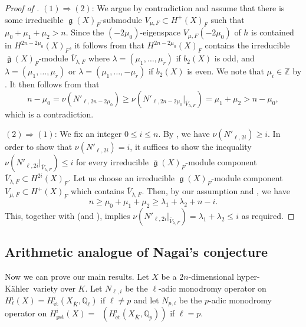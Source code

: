 \documentclass[12pt,reqno]{amsart}
\theoremstyle{definition}
\newcommand{\Q}{{\mathds Q}}
\newcommand{\Z}{{\mathds Z}}
\DeclareMathOperator{\Dpst}{\mathit{D}_{\mathrm{pst}}}
\renewcommand\ge{\mathop{\mathfrak{g}}\nolimits}
\newcommand{\et}{\mathrm{\acute{e}t}}
\newcommand{\hk}{hyper-Kähler~}
\DeclareMathOperator{\pst}{pst}
\numberwithin{equation}{section}
\begin{document}
\begin{proof}[Proof of ]


$(1) \Rightarrow (2)$: 
We argue by contradiction and assume that there is some
irreducible $\ge(X)_F$-submodule
$V_{\mu, F} \subset H^+(X)_F$ such that
$\mu_0 + \mu_1 + \mu_2 >n$.
Since the $(-2\mu_0)$-eigenspace $V_{\mu, F}(-2\mu_0)$ of $h$ is contained in $H^{2n-2\mu_0}(X)_F$,
it follows from 
that 
$H^{2n-2\mu_0}(X)_F$
contains the irreducible $\overline{\ge}(X)_F$-module
$\overline{V}_{\lambda, F}$
where $\lambda=(\mu_1, \dotsc, \mu_r)$ if $b_2(X)$ is odd, and 
$\lambda=(\mu_1, \dotsc, \mu_r)$
or $\lambda=(\mu_1, \dotsc, -\mu_r)$ if $b_2(X)$ is even.
We note that $\mu_i \in \Z$ by .
It then follows from
 that
\[
n-\mu_0=\nu(N'_{\ell, 2n-2\mu_0}) \geq \nu(N'_{\ell, 2n-2\mu_0}\vert_{\overline{V}_{\lambda, F}})=\mu_1 + \mu_2 > n-\mu_0,
\]
which is a contradiction.

$(2) \Rightarrow (1)$: 
We fix an integer $0 \leq i \leq n$.
By , we have
$\nu(N'_{\ell, 2i}) \geq i$.
In order to show that $\nu(N'_{\ell, 2i}) =i$, it suffices to show 
the inequality
$
\nu(N'_{\ell, 2i}\vert_{\overline{V}_{\lambda, F}}) \leq i
$
for every irreducible $\overline{\ge}(X)_F$-module component
$\overline{V}_{\lambda, F} \subset H^{2i}(X)_F$.
Let us choose an irreducible $\ge(X)_F$-module component
$V_{\mu, F} \subset H^{+}(X)_F$ which contains $\overline{V}_{\lambda, F}$.
Then, by our assumption and ,
we have 
\[
n \geq \mu_0 + \mu_1 + \mu_2 \geq \lambda_1 + \lambda_2 + n -i.
\]
This, together with  (and ), implies 
$
\nu(N'_{\ell, 2i}\vert_{\overline{V}_{\lambda, F}}) = \lambda_1 + \lambda_2 \leq i
$
as required.
\end{proof}





\subsection{Arithmetic analogue of Nagai's conjecture}\label{subsection:Arithmetic analogue of Nagai's conjecture}

Now we can prove our main results.
Let $X$ be a $2n$-dimensional \hk variety over $K$.
Let
$N_{\ell, i}$
be
the $\ell$-adic monodromy operator on $H^i_\ell(X)=H^{i}_{\et} (X_{\overline{K}}, \Q_{\ell})$
if $\ell \neq p$
and
let
$N_{p, i}$
be the $p$-adic monodromy operator on
$H^i_{\pst}(X)=\Dpst(H^{i}_{\et} (X_{\overline{K}}, \Q_{p}))$ if $\ell = p$.
\end{document}
